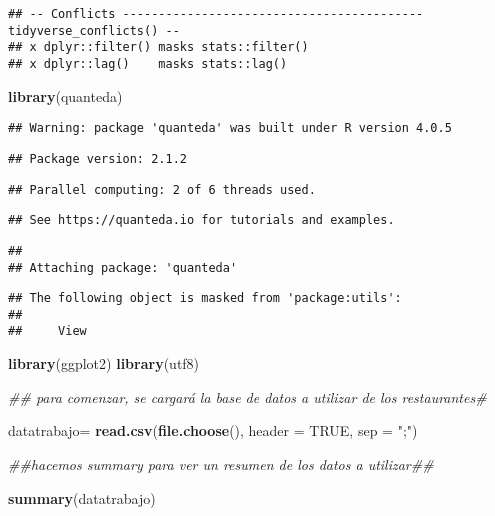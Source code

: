 \documentclass[
]{article}
\newenvironment{Shaded}{\begin{snugshade}}{\end{snugshade}}
\newcommand{\CommentTok}[1]{\textcolor[rgb]{0.56,0.35,0.01}{\textit{#1}}}
\newcommand{\DataTypeTok}[1]{\textcolor[rgb]{0.13,0.29,0.53}{#1}}
\newcommand{\KeywordTok}[1]{\textcolor[rgb]{0.13,0.29,0.53}{\textbf{#1}}}
\newcommand{\NormalTok}[1]{#1}
\newcommand{\OtherTok}[1]{\textcolor[rgb]{0.56,0.35,0.01}{#1}}
\newcommand{\StringTok}[1]{\textcolor[rgb]{0.31,0.60,0.02}{#1}}
\begin{document}
\begin{verbatim}
## -- Conflicts ------------------------------------------ tidyverse_conflicts() --
## x dplyr::filter() masks stats::filter()
## x dplyr::lag()    masks stats::lag()
\end{verbatim}

\begin{Shaded}
\begin{Highlighting}[]
\KeywordTok{library}\NormalTok{(quanteda)}
\end{Highlighting}
\end{Shaded}

\begin{verbatim}
## Warning: package 'quanteda' was built under R version 4.0.5
\end{verbatim}

\begin{verbatim}
## Package version: 2.1.2
\end{verbatim}

\begin{verbatim}
## Parallel computing: 2 of 6 threads used.
\end{verbatim}

\begin{verbatim}
## See https://quanteda.io for tutorials and examples.
\end{verbatim}

\begin{verbatim}
## 
## Attaching package: 'quanteda'
\end{verbatim}

\begin{verbatim}
## The following object is masked from 'package:utils':
## 
##     View
\end{verbatim}

\begin{Shaded}
\begin{Highlighting}[]
\KeywordTok{library}\NormalTok{(ggplot2)}
\KeywordTok{library}\NormalTok{(utf8)}

\CommentTok{## para comenzar, se cargará la base de datos a utilizar de los restaurantes#}



\NormalTok{datatrabajo=}\StringTok{ }\KeywordTok{read.csv}\NormalTok{(}\KeywordTok{file.choose}\NormalTok{(), }\DataTypeTok{header =} \OtherTok{TRUE}\NormalTok{, }\DataTypeTok{sep =} \StringTok{";"}\NormalTok{)}

\CommentTok{##hacemos summary para ver un resumen de los datos a utilizar##}

\KeywordTok{summary}\NormalTok{(datatrabajo)}
\end{Highlighting}
\end{Shaded}
\end{document}
